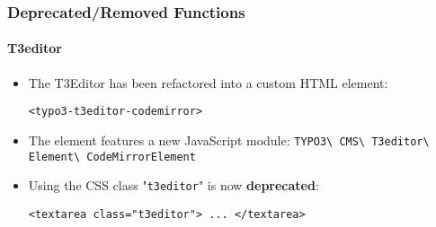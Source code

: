 %

\begin{frame}[fragile]
	\frametitle{Deprecated/Removed Functions}
	\framesubtitle{T3editor}


	\begin{itemize}
		\item The T3Editor has been refactored into a custom HTML element:
\begin{lstlisting}
<typo3-t3editor-codemirror>
\end{lstlisting}

		\item The element features a new JavaScript module:\newline
			\small
				\texttt{TYPO3\textbackslash
					CMS\textbackslash
					T3editor\textbackslash
					Element\textbackslash
					CodeMirrorElement}
			\normalsize

		\item Using the CSS class "\texttt{t3editor}" is now \textbf{deprecated}:
\begin{lstlisting}
<textarea class="t3editor"> ... </textarea>
\end{lstlisting}

	\end{itemize}

\end{frame}

